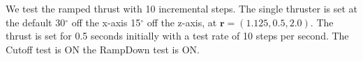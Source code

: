We test the ramped thrust with 10 incremental steps. The single thruster is set at the default 30$^\circ$ off the x-axis 15$^\circ$ off the z-axis, at $\bm r = \left(1.125,0.5,2.0\right)$. The thrust is set for 0.5 seconds initially with a test rate of 10 steps per second. The Cutoff test is ON the RampDown test is ON.